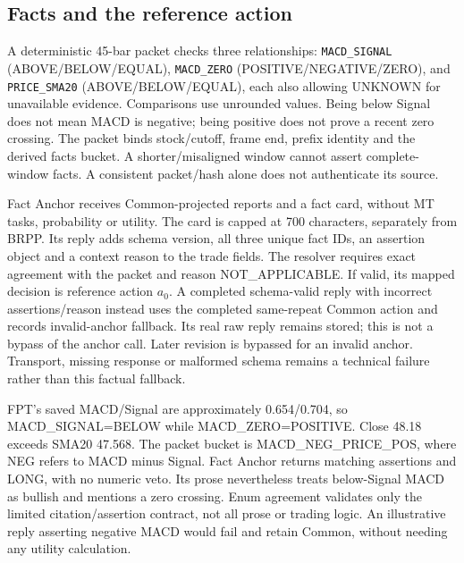 \subsection{Facts and the reference action}\label{s:20f38305181c1972}
\begingroup\raggedright
A deterministic 45-bar packet checks three relationships:
\texttt{MACD\_SIGNAL} (ABOVE/BELOW/EQUAL), \texttt{MACD\_ZERO}
(POSITIVE/NEGATIVE/ZERO), and \texttt{PRICE\_SMA20} (ABOVE/BELOW/EQUAL),
each also allowing UNKNOWN for unavailable evidence. Comparisons use
unrounded values. Being below Signal does not mean MACD is negative;
being positive does not prove a recent zero crossing. The packet binds
stock/cutoff, frame end, prefix identity and the derived facts bucket.
A shorter/misaligned window cannot assert complete-window facts. A
consistent packet/hash alone does not authenticate its source.\par\endgroup

Fact Anchor receives Common-projected reports and a fact card, without
MT tasks, probability or utility. The card is capped at 700 characters,
separately from BRPP. Its reply adds schema version, all three unique
fact IDs, an assertion object and a context reason to the trade fields.
The resolver requires exact agreement with the packet and reason
NOT\_APPLICABLE. If valid, its mapped decision is reference action $a_0$.
A completed schema-valid reply with incorrect assertions/reason instead
uses the completed same-repeat Common action and records invalid-anchor
fallback. Its real raw reply remains stored; this is not a bypass of
the anchor call. Later revision is bypassed for an invalid anchor.
Transport, missing response or malformed schema remains a technical
failure rather than this factual fallback.

FPT's saved MACD/Signal are approximately 0.654/0.704, so
MACD\_SIGNAL=BELOW while MACD\_ZERO=POSITIVE. Close 48.18 exceeds SMA20
47.568. The packet bucket is MACD\_NEG\_PRICE\_POS, where NEG refers to
MACD minus Signal. Fact Anchor returns matching assertions and LONG,
with no numeric veto. Its prose nevertheless treats below-Signal MACD
as bullish and mentions a zero crossing. Enum agreement validates only
the limited citation/assertion contract, not all prose or trading logic.
An illustrative reply asserting negative MACD would fail and retain
Common, without needing any utility calculation.

